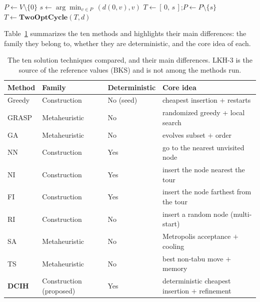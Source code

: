 \documentclass[12pt,a4paper,oneside]{report}
\begin{document}
\begin{algorithm}[t]
\small
\DontPrintSemicolon
{}
\caption{DCIH — Deterministic Cheapest-Insertion Heuristic for the $k$-TSP}
\label{alg:dcih}
$P \leftarrow V\setminus\{0\}$\;
$s \leftarrow \arg\min_{v\in P}\,(d(0,v),v)$ 
$T \leftarrow [\,0,\,s\,]$;\quad $P\leftarrow P\setminus\{s\}$\;
$T \leftarrow \textbf{TwoOptCycle}(T,d)$\;
\;
\end{algorithm}

Table~\ref{tab:metodos} summarizes the ten methods and highlights their main
differences: the family they belong to, whether they are deterministic, and the
core idea of each.

\begin{table}[h]
\centering
\caption{The ten solution techniques compared, and their main differences. LKH-3
is the source of the reference values (BKS) and is not among the methods run.}
\label{tab:metodos}
{\small
\begin{tabular}{@{}llll@{}}
\toprule
\textbf{Method} & \textbf{Family} & \textbf{Deterministic} & \textbf{Core idea} \\
\midrule
Greedy & Construction & No (seed) & cheapest insertion + restarts \\
GRASP & Metaheuristic & No & randomized greedy + local search \\
GA & Metaheuristic & No & evolves subset $+$ order \\
NN & Construction & Yes & go to the nearest unvisited node \\
NI & Construction & Yes & insert the node nearest the tour \\
FI & Construction & Yes & insert the node farthest from the tour \\
RI & Construction & No & insert a random node (multi-start) \\
SA & Metaheuristic & No & Metropolis acceptance $+$ cooling \\
TS & Metaheuristic & No & best non-tabu move $+$ memory \\
\textbf{DCIH} & Construction (proposed) & Yes & deterministic cheapest insertion $+$ refinement \\
\bottomrule
\end{tabular}}
\end{table}
\end{document}
